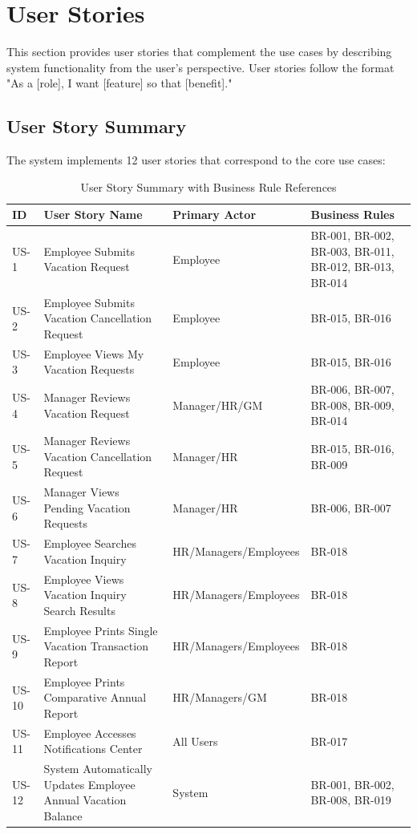 \documentclass[12pt,a4paper]{article}
\begin{document}
\section{User Stories}

This section provides user stories that complement the use cases by describing system functionality from the user's perspective. User stories follow the format "As a [role], I want [feature] so that [benefit]."

\subsection{User Story Summary}
The system implements 12 user stories that correspond to the core use cases:

\begin{table}[H]
\centering
\begin{tabular}{|p{1cm}|p{4cm}|p{3cm}|p{3cm}|}
\hline
\textbf{ID} & \textbf{User Story Name} & \textbf{Primary Actor} & \textbf{Business Rules} \\
\hline
US-1 & Employee Submits Vacation Request & Employee & BR-001, BR-002, BR-003, BR-011, BR-012, BR-013, BR-014 \\
\hline
US-2 & Employee Submits Vacation Cancellation Request & Employee & BR-015, BR-016 \\
\hline
US-3 & Employee Views My Vacation Requests & Employee & BR-015, BR-016 \\
\hline
US-4 & Manager Reviews Vacation Request & Manager/HR/GM & BR-006, BR-007, BR-008, BR-009, BR-014 \\
\hline
US-5 & Manager Reviews Vacation Cancellation Request & Manager/HR & BR-015, BR-016, BR-009 \\
\hline
US-6 & Manager Views Pending Vacation Requests & Manager/HR & BR-006, BR-007 \\
\hline
US-7 & Employee Searches Vacation Inquiry & HR/Managers/Employees & BR-018 \\
\hline
US-8 & Employee Views Vacation Inquiry Search Results & HR/Managers/Employees & BR-018 \\
\hline
US-9 & Employee Prints Single Vacation Transaction Report & HR/Managers/Employees & BR-018 \\
\hline
US-10 & Employee Prints Comparative Annual Report & HR/Managers/GM & BR-018 \\
\hline
US-11 & Employee Accesses Notifications Center & All Users & BR-017 \\
\hline
US-12 & System Automatically Updates Employee Annual Vacation Balance & System & BR-001, BR-002, BR-008, BR-019 \\
\hline
\end{tabular}
\caption{User Story Summary with Business Rule References}
\end{table}
\end{document}
